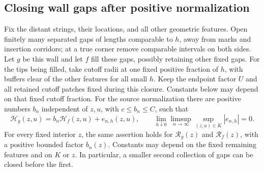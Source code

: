 \subsection{Closing wall gaps after positive normalization}
\label{obs:closing-gaps}

\begin{proposition}
\label{prop:obs-gap-closure}
Fix the distant strings, their locations, and all other geometric
features.  Open finitely many separated gaps of lengths comparable
to $h$, away from marks and insertion corridors; at a true corner
remove comparable intervals on both sides.  Let $g$ be this wall
and let $f$ fill these gaps, possibly retaining other fixed gaps.
For the tips being filled, take cutoff radii at one fixed positive
fraction of $h$, with buffers clear of the other features for all
small $h$.  Keep the endpoint factor $U$ and all retained cutoff
patches fixed during this closure.  Constants below may depend on
that fixed cutoff fraction.
For the source normalization there are positive numbers $b_n$
independent of $z,u$, with $c\le b_n\le C$, such that
\begin{equation}
 \mathcal H_g(z,u)=b_n\mathcal H_f(z,u)+e_{n,h}(z,u),
 \qquad
 \lim_{h\downarrow0}\limsup_{n\to\infty}
       \sup_{(z,u)\in K}|e_{n,h}|=0.
 \label{obs:source-gap-closure}
\end{equation}
For every fixed interior $z$, the same assertion holds for
$\mathcal R_g(z)$ and $\mathcal R_f(z)$, with a positive bounded
factor $b_n(z)$.  Constants may depend on the fixed remaining
features and on $K$ or $z$.  In particular, a smaller second
collection of gaps can be closed before the first.
\end{proposition}

